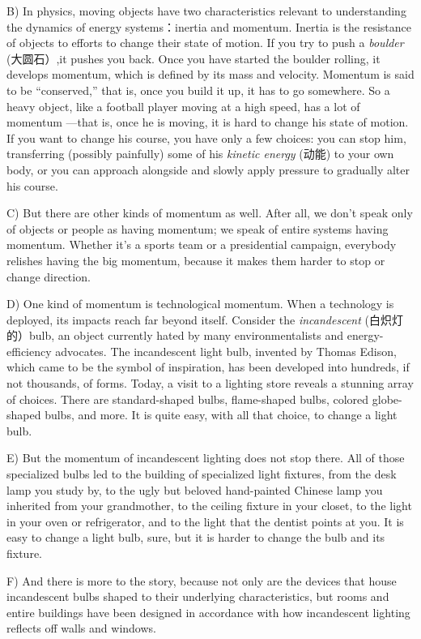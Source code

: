 \documentclass[UTF8,11pt]{ctexart}
\begin{document}
B) In physics, moving objects have two characteristics relevant to understanding the dynamics of energy systems：inertia and momentum. Inertia is the resistance of objects to efforts to change their state of motion. If you try to push a\textit{ boulder} (大圆石）,it pushes you back. Once you have started the boulder rolling, it develops momentum, which is defined by its mass and velocity. Momentum is said to be “conserved,” that is, once you build it up, it has to go somewhere. So a heavy object, like a football player moving at a high speed, has a lot of momentum —that is, once he is moving, it is hard to change his state of motion. If you want to change his course, you have only a few choices: you can stop him, transferring (possibly painfully) some of his\textit{ kinetic energy} (动能) to your own body, or you can approach alongside and slowly apply pressure to gradually alter his course.


C) But there are other kinds of momentum as well. After all, we don’t speak only of objects or people as having momentum; we speak of entire systems having momentum. Whether it’s a sports team or a presidential campaign, everybody relishes having the big momentum, because it makes them harder to stop or change direction.


D) One kind of momentum is technological momentum. When a technology is deployed, its impacts reach far beyond itself. Consider the\textit{ incandescent} (白炽灯的）bulb, an object currently hated by many environmentalists and energy-efficiency advocates. The incandescent light bulb, invented by Thomas Edison, which came to be the symbol of inspiration, has been developed into hundreds, if not thousands, of forms. Today, a visit to a lighting store reveals a stunning array of choices. There are standard-shaped bulbs, flame-shaped bulbs, colored globe-shaped bulbs, and more. It is quite easy, with all that choice, to change a light bulb.


E) But the momentum of incandescent lighting does not stop there. All of those specialized bulbs led to the building of specialized light fixtures, from the desk lamp you study by, to the ugly but beloved hand-painted Chinese lamp you inherited from your grandmother, to the ceiling fixture in your closet, to the light in your oven or refrigerator, and to the light that the dentist points at you. It is easy to change a light bulb, sure, but it is harder to change the bulb and its fixture.


F) And there is more to the story, because not only are the devices that house incandescent bulbs shaped to their underlying characteristics, but rooms and entire buildings have been designed in accordance with how incandescent lighting reflects off walls and windows.
\end{document}
